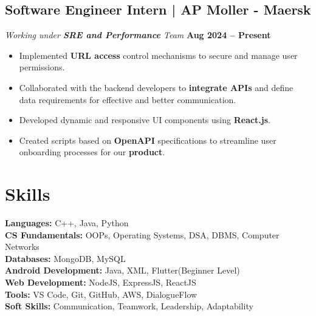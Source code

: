 \documentclass[a4paper,11pt]{article}
\begin{document}
\subsection*{Software Engineer Intern | AP Moller - Maersk}
\vspace{-7pt}
\textit{Working under \textbf{SRE and Performance} Team} \hfill \textbf{Aug 2024 – Present}
\vspace{-6pt}
\begin{itemize}[itemsep=0pt,parsep=0pt,topsep=0pt]
    \item Implemented \textbf{URL access} control mechanisms to secure and manage user permissions.
    \item Collaborated with the backend developers to \textbf{integrate APIs} and define data requirements for effective and better communication.
    \item Developed dynamic and responsive UI components using \textbf{React.js}.
    \item Created scripts based on \textbf{OpenAPI} specifications to streamline user onboarding processes for our \textbf{product}.
\end{itemize}
\vspace{-6pt}

\section*{Skills}
\vspace{-4pt}
\textbf{Languages:} C++, Java, Python \\
\textbf{CS Fundamentals:} OOPs, Operating Systems, DSA, DBMS, Computer Networks \\
\textbf{Databases:} MongoDB, MySQL \\
\textbf{Android Development:} Java, XML, Flutter(Beginner Level) \\
\textbf{Web Development:} NodeJS, ExpressJS, ReactJS \\
\textbf{Tools:} VS Code, Git, GitHub, AWS, DialogueFlow \\
\textbf{Soft Skills:} Communication, Teamwork, Leadership, Adaptability
\vspace{-2mm}
\end{document}
